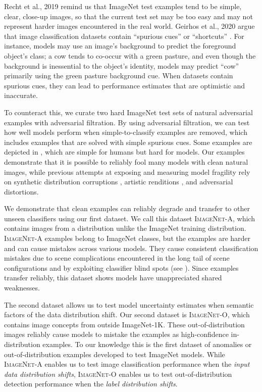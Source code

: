 \documentclass[10pt,twocolumn,letterpaper]{article}
\begin{document}
Recht et al., 2019 \cite{Recht2019DoIC} remind us that ImageNet test examples tend to be simple, clear, close-up images, so that the current test set may be too easy and may not represent harder images encountered in the real world. Geirhos et al., 2020 argue that image classification datasets contain ``spurious cues'' or ``shortcuts'' \cite{Geirhos2020ShortcutLI, Arjovsky2019InvariantRM}. For instance, models may use an image's background to predict the foreground object's class; a cow tends to co-occur with a green pasture, and even though the background is inessential to the object's identity, models may predict ``cow'' primarily using the green pasture background cue. When datasets contain spurious cues, they can lead to performance estimates that are optimistic and inaccurate.


To counteract this, we curate two hard ImageNet test sets of natural adversarial examples with adversarial filtration. By using adversarial filtration, we can test how well models perform when simple-to-classify examples are removed, which includes examples that are solved with simple spurious cues. Some examples are depicted in , which are simple for humans but hard for models. Our examples demonstrate that it is possible to reliably fool many models with clean natural images, while previous attempts at exposing and measuring model fragility rely on synthetic distribution corruptions \cite{geirhos,hendrycks2019robustness}, artistic renditions \cite{Hendrycks2020TheMF}, and adversarial distortions.

We demonstrate that clean examples can reliably degrade and transfer to other unseen classifiers using our first dataset. We call this dataset \textsc{ImageNet-A}, which contains images from a distribution unlike the ImageNet training distribution. \textsc{ImageNet-A} examples belong to ImageNet classes, but the examples are harder and can cause mistakes across various models. They cause consistent classification mistakes due to scene complications encountered in the long tail of scene configurations and by exploiting classifier blind spots (see ). Since examples transfer reliably, this dataset shows models have unappreciated shared weaknesses.

The second dataset allows us to test model uncertainty estimates when semantic factors of the data distribution shift. Our second dataset is \textsc{ImageNet-O}, which contains image concepts from outside ImageNet-1K. These out-of-distribution images reliably cause models to mistake the examples as high-confidence in-distribution examples. To our knowledge this is the first dataset of anomalies or out-of-distribution examples developed to test ImageNet models. While \textsc{ImageNet-A} enables us to test image classification performance when the \emph{input data distribution shifts}, \textsc{ImageNet-O} enables us to test out-of-distribution detection performance when the \emph{label distribution shifts}.
\end{document}
